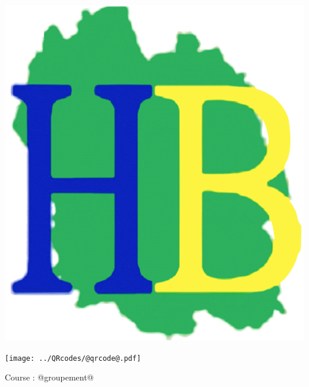 \Huge

\begin{block} %
{}\hfill {}
{}\hfill {}
\begin{minipage}{0.15\linewidth}
\includegraphics[width=\textwidth]{../logo-HB.png}
\end{minipage}
{}\hfill {}



\begin{minipage}{0.48\linewidth}
\texttt{[image: ../QRcodes/@qrcode@.pdf]}

\vspace{0.5cm}

Course : @groupement@
\end{minipage}
\begin{minipage}{0.5\linewidth}
{}\hfill {}
{}\hfill {}


\end{minipage}
\end{block}
